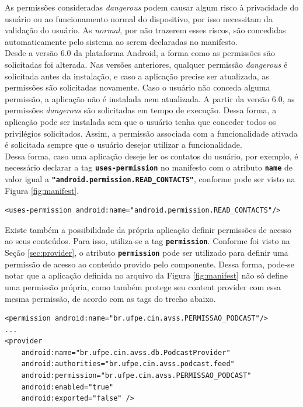 \documentclass[a4paper,12pt]{article}
\begin{document}
As permissões consideradas \textit{dangerous} podem causar algum risco à privacidade do usuário ou ao funcionamento normal do dispositivo, por isso necessitam da validação do usuário. As \textit{normal}, por não trazerem esses riscos, são concedidas automaticamente pelo sistema ao serem declaradas no manifesto.\\

Desde a versão 6.0 da plataforma Android, a forma como as permissões são solicitadas foi alterada. Nas versões anteriores, qualquer permissão \textit{dangerous} é solicitada antes da instalação, e caso a aplicação precise ser atualizada, as permissões são solicitadas novamente. Caso o usuário não conceda alguma permissão, a aplicação não é instalada nem atualizada. A partir da versão 6.0, as permissões \textit{dangerous} são solicitadas em tempo de execução. Dessa forma, a aplicação pode ser instalada sem que o usuário tenha que conceder todos os privilégios solicitados. Assim,  a permissão associada com a funcionalidade ativada é solicitada sempre que o usuário desejar utilizar a funcionalidade.\\

Dessa forma, caso uma aplicação deseje ler os contatos do usuário, por exemplo, é necessário declarar a tag {\small\texttt{\textbf{uses-permission}}} no manifesto com o atributo {\small\texttt{\textbf{name}}} de valor igual a {\small\texttt{\textbf{"android.permission.READ\_CONTACTS"}}}, conforme pode ser visto na Figura \ref{fig:manifest}.

{\fontsize{9pt}{12pt}
\begin{verbatim}
<uses-permission android:name="android.permission.READ_CONTACTS"/>
\end{verbatim}
}


Existe também a possibilidade da própria aplicação definir permissões de acesso ao seus conteúdos. Para isso, utiliza-se a tag {\small\texttt{\textbf{permission}}}. Conforme foi visto na Seção \ref{sec:provider}, o atributo {\small\texttt{\textbf{permission}}} pode ser utilizado para definir uma permissão de acesso ao conteúdo provido pelo componente. Dessa forma, pode-se notar que a aplicação definida no arquivo da Figura \ref{fig:manifest} não só define uma permissão própria, como também protege seu content provider com essa mesma permissão, de acordo com as tags do trecho abaixo.

{\fontsize{9pt}{12pt}
\begin{verbatim}
<permission android:name="br.ufpe.cin.avss.PERMISSAO_PODCAST"/>
...
<provider
    android:name="br.ufpe.cin.avss.db.PodcastProvider"
    android:authorities="br.ufpe.cin.avss.podcast.feed"
    android:permission="br.ufpe.cin.avss.PERMISSAO_PODCAST"
    android:enabled="true"
    android:exported="false" />
\end{verbatim}
}
\end{document}

